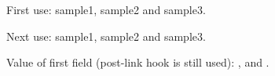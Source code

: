 \documentclass{article}
\begin{document}
First use: \gls{sample1}, \gls{sample2} and \gls{sample3}.

Next use: \gls{sample1}, \gls{sample2} and \gls{sample3}.

Value of first field (post-link hook is still used): , 
and .

\printglossaries
\end{document}
